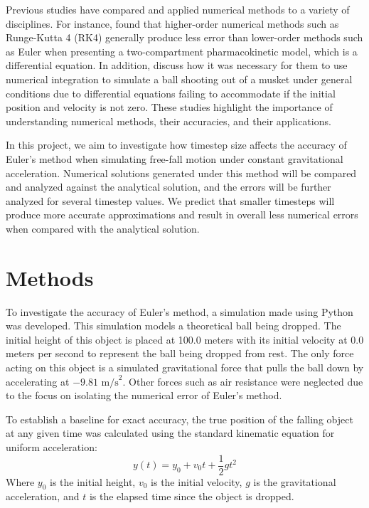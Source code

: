 \documentclass[12pt]{article}
\begin{document}
Previous studies have compared and applied numerical methods to a variety of disciplines. For instance, \citet{kaniz2025} found that higher-order numerical methods such as Runge-Kutta 4 (RK4) generally produce less error than lower-order methods such as Euler when presenting a two-compartment pharmacokinetic model, which is a differential equation. In addition, \citet{mungandenker2012} discuss how it was necessary for them to use numerical integration to simulate a ball shooting out of a musket under general conditions due to differential equations failing to accommodate if the initial position and velocity is not zero. These studies highlight the importance of understanding numerical methods, their accuracies, and their applications.

In this project, we aim to investigate how timestep size affects the accuracy of Euler's method when simulating free-fall motion under constant gravitational acceleration. Numerical solutions generated under this method will be compared and analyzed against the analytical solution, and the errors will be further analyzed for several timestep values. We predict that smaller timesteps will produce more accurate approximations and result in overall less numerical errors when compared with the analytical solution.

\section{Methods}

To investigate the accuracy of Euler's method, a simulation made using Python was developed.
This simulation models a theoretical ball being dropped. The initial height of this object is placed at 100.0 meters with its initial velocity at 0.0 meters per second to represent the ball being dropped from rest. The only force acting on this object is a simulated gravitational force that pulls the ball down by accelerating at $-9.81 \text{ m/s}^2$. Other forces such as air resistance were neglected due to the focus on isolating the numerical error of Euler's method.

To establish a baseline for exact accuracy, the true position of the falling object at any given time was calculated using the standard kinematic equation for uniform acceleration:
\begin{equation}
y(t) = y_0 + v_0 t + \frac{1}{2} g t^2
\label{eq:kinematic}
\end{equation}
Where $y_0$ is the initial height, $v_0$ is the initial velocity, $g$ is the gravitational acceleration, and $t$ is the elapsed time since the object is dropped.
\end{document}
